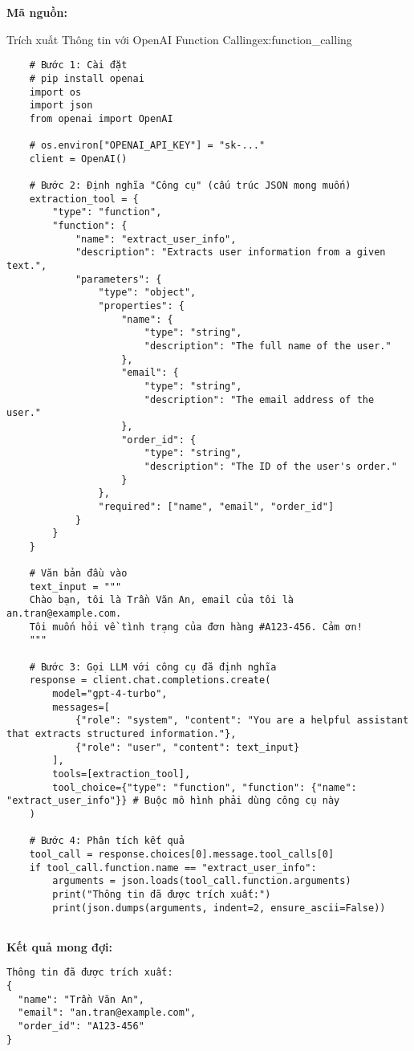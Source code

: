 \textbf{Mã nguồn:}
\begin{example}{Trích xuất Thông tin với OpenAI Function Calling}{ex:function_calling}
    \begin{verbatim}
    # Bước 1: Cài đặt
    # pip install openai
    import os
    import json
    from openai import OpenAI
    
    # os.environ["OPENAI_API_KEY"] = "sk-..."
    client = OpenAI()
    
    # Bước 2: Định nghĩa "Công cụ" (cấu trúc JSON mong muốn)
    extraction_tool = {
        "type": "function",
        "function": {
            "name": "extract_user_info",
            "description": "Extracts user information from a given text.",
            "parameters": {
                "type": "object",
                "properties": {
                    "name": {
                        "type": "string",
                        "description": "The full name of the user."
                    },
                    "email": {
                        "type": "string",
                        "description": "The email address of the user."
                    },
                    "order_id": {
                        "type": "string",
                        "description": "The ID of the user's order."
                    }
                },
                "required": ["name", "email", "order_id"]
            }
        }
    }
    
    # Văn bản đầu vào
    text_input = """
    Chào bạn, tôi là Trần Văn An, email của tôi là an.tran@example.com.
    Tôi muốn hỏi về tình trạng của đơn hàng #A123-456. Cảm ơn!
    """
    
    # Bước 3: Gọi LLM với công cụ đã định nghĩa
    response = client.chat.completions.create(
        model="gpt-4-turbo",
        messages=[
            {"role": "system", "content": "You are a helpful assistant that extracts structured information."},
            {"role": "user", "content": text_input}
        ],
        tools=[extraction_tool],
        tool_choice={"type": "function", "function": {"name": "extract_user_info"}} # Buộc mô hình phải dùng công cụ này
    )
    
    # Bước 4: Phân tích kết quả
    tool_call = response.choices[0].message.tool_calls[0]
    if tool_call.function.name == "extract_user_info":
        arguments = json.loads(tool_call.function.arguments)
        print("Thông tin đã được trích xuất:")
        print(json.dumps(arguments, indent=2, ensure_ascii=False))
    
    \end{verbatim}
\end{example}
\textbf{Kết quả mong đợi:}
\begin{verbatim}
Thông tin đã được trích xuất:
{
  "name": "Trần Văn An",
  "email": "an.tran@example.com",
  "order_id": "A123-456"
}
\end{verbatim}

